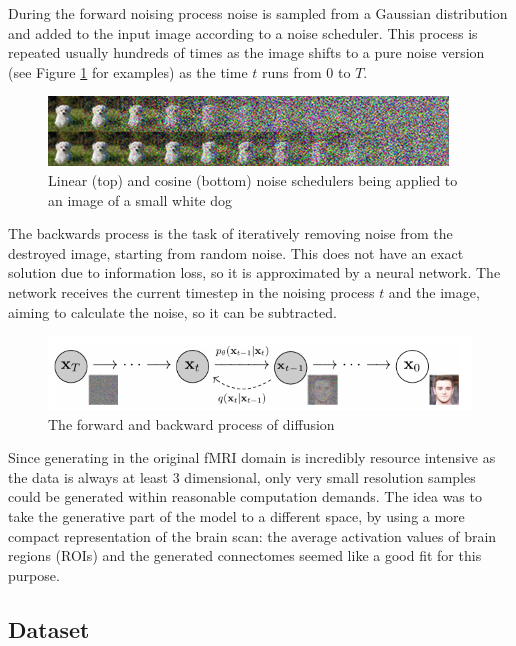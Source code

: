	During the forward noising process noise is sampled from a Gaussian distribution and added to the input image according to a noise scheduler. This process is repeated usually hundreds of times as the image shifts to a pure noise version (see Figure \ref{fig:scheduler} for examples) as the time $t$ runs from 0 to $T$.
	
	\begin{figure}[!h]
		\label{fig:scheduler}
		\centering
		\includegraphics[width=\textwidth]{figures/scheduler.png}
		\caption{Linear (top) and cosine (bottom) noise schedulers being applied to an image of a small white dog \cite{nichol2021improved}}
	\end{figure}
	
	
	The backwards process is the task of iteratively removing noise from the destroyed image, starting from random noise. This does not have an exact solution due to information loss, so it is approximated by a neural network. The network receives the current timestep in the noising process $t$ and the image, aiming to calculate the noise, so it can be subtracted.
	
	\begin{figure}[!h]
		\centering
		\includegraphics[width=\textwidth]{figures/diffusion.png}
		\caption{The forward and backward process of diffusion\cite{ho2020denoising}}
	\end{figure}
	
	
	Since generating in the original fMRI domain is incredibly resource intensive as the data is always at least 3 dimensional, only very small resolution samples could be generated within reasonable computation demands. The idea was to take the generative part of the model to a different space, by using a more compact representation of the brain scan: the average activation values of brain regions (ROIs) and the generated connectomes seemed like a good fit for this purpose.

	\subsection{Dataset}
	\label{sec:HCP}
	
